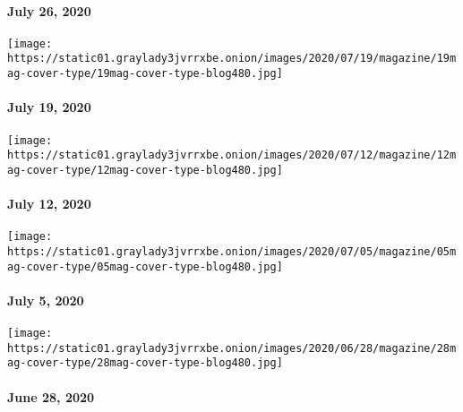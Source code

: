 \hypertarget{july-26-2020}{%
\paragraph{July 26, 2020}\label{july-26-2020}}

\href{https://www.nytimes3xbfgragh.onion/issue/magazine/2020/07/17/the-71920-issue}{}

\texttt{[image: https://static01.graylady3jvrrxbe.onion/images/2020/07/19/magazine/19mag-cover-type/19mag-cover-type-blog480.jpg]}

\hypertarget{july-19-2020}{%
\paragraph{July 19, 2020}\label{july-19-2020}}

\href{https://www.nytimes3xbfgragh.onion/issue/magazine/2020/07/10/the-71220-issue}{}

\texttt{[image: https://static01.graylady3jvrrxbe.onion/images/2020/07/12/magazine/12mag-cover-type/12mag-cover-type-blog480.jpg]}

\hypertarget{july-12-2020}{%
\paragraph{July 12, 2020}\label{july-12-2020}}

\href{https://www.nytimes3xbfgragh.onion/issue/magazine/2020/07/02/the-7520-issue}{}

\texttt{[image: https://static01.graylady3jvrrxbe.onion/images/2020/07/05/magazine/05mag-cover-type/05mag-cover-type-blog480.jpg]}

\hypertarget{july-5-2020}{%
\paragraph{July 5, 2020}\label{july-5-2020}}

\href{https://www.nytimes3xbfgragh.onion/issue/magazine/2020/06/25/the-62820-issue}{}

\texttt{[image: https://static01.graylady3jvrrxbe.onion/images/2020/06/28/magazine/28mag-cover-type/28mag-cover-type-blog480.jpg]}

\hypertarget{june-28-2020}{%
\paragraph{June 28, 2020}\label{june-28-2020}}

\href{https://www.nytimes3xbfgragh.onion/issue/magazine/2020/06/19/the-62120-issue}{}

